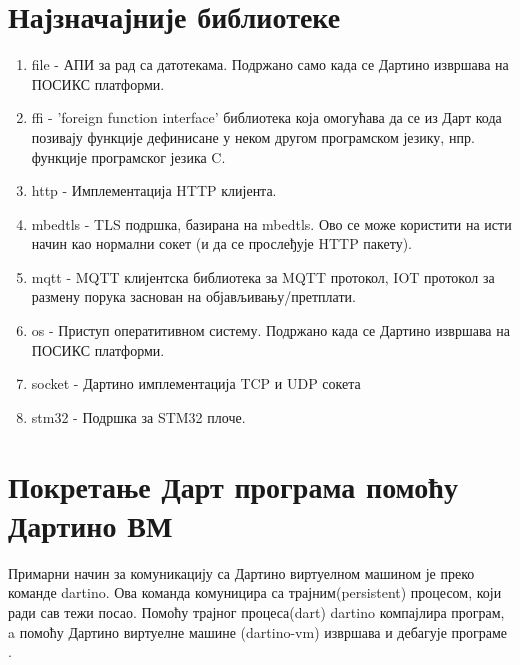 \documentclass[12pt,oneside]{memoir}
\begin{document}
\section{Најзначајније библиотеке}
\begin{enumerate}

\item file - АПИ за рад са датотекама. Подржано само када се Дартино извршава на ПОСИКС платформи.

\item ffi - 'foreign function interface' библиотека која омогућава да се из Дарт кода позивају функције дефинисане у неком другом програмском језику, нпр. функције програмског језика C.

\item http - Имплементација HTTP клијента.

\item mbedtls - TLS подршка, базирана на mbedtls. Ово се може користити на исти начин као нормални сокет (и да се прослеђује HTTP пакету).

\item mqtt - MQTT клијентска библиотека за MQTT протокол, IOT протокол за размену порука заснован на објављивању/претплати.

\item os - Приступ оператитивном систему. Подржано када се Дартино извршава на ПОСИКС платформи.

\item socket - Дартино имплементација TCP и UDP сокета

\item stm32 - Подршка за STM32 плоче.

\end{enumerate}

\section{Покретање Дарт програма помоћу Дартино ВМ}

Примарни начин за комуникацију са Дартино виртуелном машином је преко команде dartino. Ова команда комуницира са трајним(persistent) процесом, који ради сав тежи посао. Помоћу трајног процеса(dart) dartino компајлира програм, a помоћу Дартино виртуелне машине (dartino-vm) извршава и дебагује програме .\\
\end{document}
